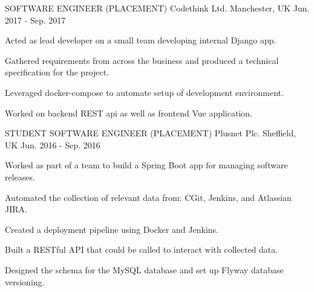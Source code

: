 \begin{cventries}
\cventry
{SOFTWARE ENGINEER (PLACEMENT)} %
{Codethink Ltd.} %
{Manchester, UK} %
{Jun. 2017 - Sep. 2017} %
{
    \begin{cvitems}
    \item{Acted as lead developer on a small team developing internal Django app.}
    \item{Gathered requirements from across the business and produced a technical specification for the project.}
    \item{Leveraged docker-compose to automate setup of development environment.}
    \item{Worked on backend REST api as well as frontend Vue application.}
    \end{cvitems}
}

\cventry
{STUDENT SOFTWARE ENGINEER (PLACEMENT)} %
{Plusnet Plc.} %
{Sheffield, UK} %
{Jun. 2016 - Sep. 2016} %
{
    \begin{cvitems}
    \item{Worked as part of a team to build a Spring Boot app for managing software releases.}
    \item{Automated the collection of relevant data from: CGit, Jenkins, and Atlassian JIRA.}
    \item{Created a deployment pipeline using Docker and Jenkins.}
    \item{Built a RESTful API that could be called to interact with collected data.}
    \item{Designed the schema for the MySQL database and set up Flyway database versioning.}
    \end{cvitems}
}

\end{cventries}
